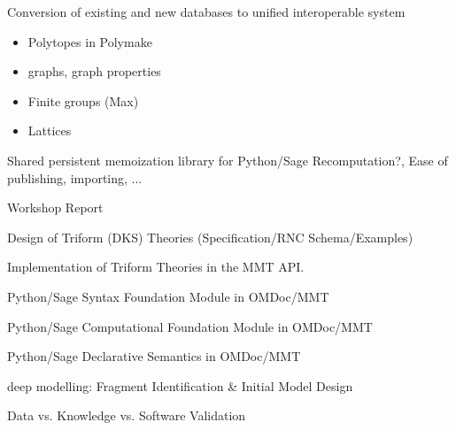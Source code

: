 \begin{workpackage}[id=dksbases,wphases=1-48!.5,
  title=Data/Knowledge/Software-Bases,lead=JU,
  ZHRM=1,JURM=36,USHRM=12,UWRM=3]
\begin{wpdelivs}
  \begin{wpdeliv}[due=12,id=conv,dissem=PU,nature=DEC]
        {Conversion of existing and new databases to unified interoperable system}
     \begin{itemize}
     \item Polytopes in Polymake
     \item graphs, graph properties
     \item Finite groups (Max)
     \item Lattices
     \end{itemize}
   \end{wpdeliv}
  \begin{wpdeliv}[due=24,id=persistent-memoization,dissem=PU,nature=O]
    {Shared persistent memoization library for Python/Sage} 
    Recomputation?,  Ease of publishing, importing, ...
  \end{wpdeliv}
  \begin{wpdeliv}[due=9,id=wsrep,dissem=PU,nature=R]{Workshop Report}
  \end{wpdeliv}
  \begin{wpdeliv}[due=12,id=dkstheories,dissem=PU,nature=R]
        {Design of Triform (DKS) Theories (Specification/RNC Schema/Examples)}
  \end{wpdeliv}
  \begin{wpdeliv}[due=24,id=dksimp,dissem=PU,nature=O]
        {Implementation of Triform Theories in the MMT API.}
  \end{wpdeliv}
  \begin{wpdeliv}[due=12,id=pssyntax,dissem=PU,nature=DEC]
        {Python/Sage Syntax Foundation Module in OMDoc/MMT}
  \end{wpdeliv}
  \begin{wpdeliv}[due=24,id=psfoundation,dissem=PU,nature=O]
        {Python/Sage Computational Foundation Module in OMDoc/MMT}
  \end{wpdeliv}
  \begin{wpdeliv}[due=36,id=pssem,dissem=PU,nature=O]
      {Python/Sage Declarative Semantics in OMDoc/MMT}
  \end{wpdeliv}
  \begin{wpdeliv}[due=12,id=lfmmod,dissem=PU,nature=R]
      {\LMFDB deep modelling: Fragment Identification \& Initial Model Design}
  \end{wpdeliv}
  \begin{wpdeliv}[due=18,id=lfmval,dissem=PU,nature=R]
      {\LMFDB Data vs. Knowledge vs. Software Validation}

\end{wpdeliv}
\end{wpdelivs}
\end{workpackage}
